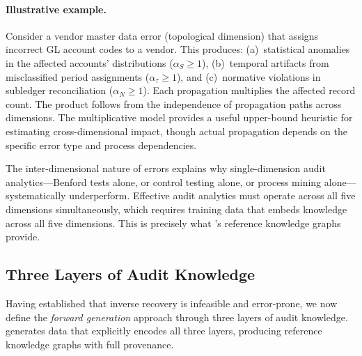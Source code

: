 \paragraph{Illustrative example.}
Consider a vendor master data error (topological dimension) that
assigns incorrect GL account codes to a vendor.  This produces:
(a)~statistical anomalies in the affected accounts' distributions
($\alpha_S \geq 1$), (b)~temporal artifacts from misclassified period
assignments ($\alpha_\tau \geq 1$), and (c)~normative violations in
subledger reconciliation ($\alpha_N \geq 1$).  Each propagation
multiplies the affected record count.  The product follows from the
independence of propagation paths across dimensions.
The multiplicative model provides a useful upper-bound heuristic
for estimating cross-dimensional impact, though actual propagation
depends on the specific error type and process dependencies.

\begin{remark}
The inter-dimensional nature of errors explains why single-dimension
audit analytics---Benford tests alone, or control testing alone, or
process mining alone---systematically underperform.  Effective audit
analytics must operate across all five dimensions simultaneously,
which requires training data that embeds knowledge across all five
dimensions.  This is precisely what \system{}'s reference knowledge
graphs provide.
\end{remark}

\subsection{Three Layers of Audit Knowledge}
\label{sec:gt_layers}

Having established that inverse recovery is infeasible and error-prone,
we now define the \emph{forward generation} approach through three
layers of audit knowledge.  \system{} generates data that explicitly
encodes all three layers, producing reference knowledge graphs with
full provenance.


